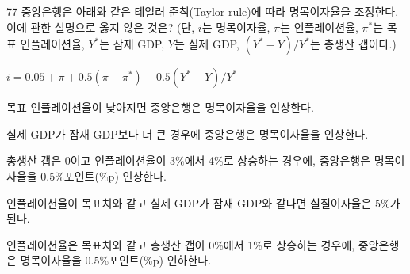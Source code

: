 \begin{question}{77}
중앙은행은 아래와 같은 테일러 준칙(Taylor rule)에 따라 명목이자율을 조정한다. 이에 관한 설명으로 옳지 않은 것은? (단, $i$는 명목이자율, $\pi$는 인플레이션율, $\pi^{*}$는 목표 인플레이션율, $Y^{*}$는 잠재 GDP, $Y$는 실제 GDP, $(Y^{*}-Y)/Y^{*}$는 총생산 갭이다.)
\begin{framedtext}
\centering $i=0.05+\pi+0.5(\pi-\pi^{*})-0.5(Y^{*}-Y)/Y^{*}$
\end{framedtext}
\begin{choices}
  \item 목표 인플레이션율이 낮아지면 중앙은행은 명목이자율을 인상한다.
  \item 실제 GDP가 잠재 GDP보다 더 큰 경우에 중앙은행은 명목이자율을 인상한다.
  \item 총생산 갭은 0이고 인플레이션율이 3\%에서 4\%로 상승하는 경우에, 중앙은행은 명목이자율을 0.5\%포인트(\%p) 인상한다.
  \item 인플레이션율이 목표치와 같고 실제 GDP가 잠재 GDP와 같다면 실질이자율은 5\%가 된다.
  \item 인플레이션율은 목표치와 같고 총생산 갭이 0\%에서 1\%로 상승하는 경우에, 중앙은행은 명목이자율을 0.5\%포인트(\%p) 인하한다.
\end{choices}
\end{question}
